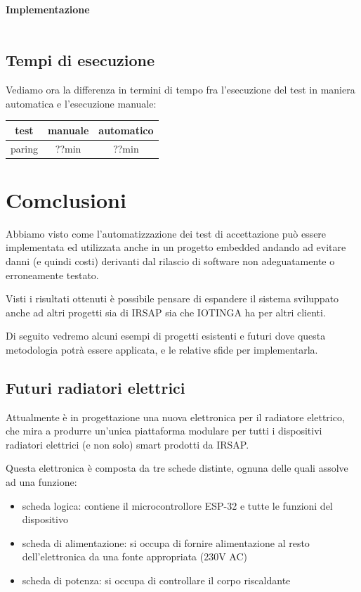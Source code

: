 \documentclass[12pt,a4paper,twoside,titlepage]{book}
\begin{document}
\subsubsection{Implementazione}
\inputminted{python3}{src/offline_working.py}

\section{Tempi di esecuzione}

Vediamo ora la differenza in termini di tempo fra l'esecuzione del test in maniera automatica
e l'esecuzione manuale:

\begin{center}
\begin{tabular}{| c | c | c |}
    \hline
    \textbf{test} & \textbf{manuale} & \textbf{automatico} \\ \hline
    paring & ??min & ??min \\ \hline
\end{tabular}
\end{center}

\chapter{Comclusioni}

Abbiamo visto come l'automatizzazione dei test di accettazione può essere implementata
ed utilizzata anche in un progetto embedded andando ad evitare danni (e quindi costi)
derivanti dal rilascio di software non adeguatamente o erroneamente testato.

Visti i risultati ottenuti è possibile pensare di espandere il sistema sviluppato
anche ad altri progetti sia di IRSAP sia che IOTINGA ha per altri clienti.

Di seguito vedremo alcuni esempi di progetti esistenti e futuri dove questa metodologia
potrà essere applicata, e le relative sfide per implementarla.

\section{Futuri radiatori elettrici}

Attualmente è in progettazione una nuova elettronica per il radiatore elettrico,
che mira a produrre un'unica piattaforma modulare per tutti i dispositivi radiatori elettrici
(e non solo) smart prodotti da IRSAP.

Questa elettronica è composta da tre schede distinte, ognuna delle quali assolve
ad una funzione:
\begin{itemize}
    \item scheda logica: contiene il microcontrollore ESP-32 e tutte le funzioni del dispositivo
    \item scheda di alimentazione: si occupa di fornire alimentazione al resto dell'elettronica
        da una fonte appropriata (230V AC)
    \item scheda di potenza: si occupa di controllare il corpo riscaldante
\end{itemize}
\end{document}
